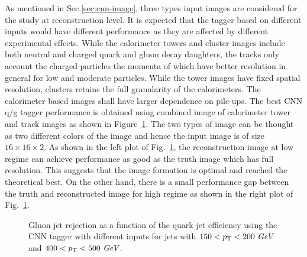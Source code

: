 As mentioned in Sec.\ref{sec:cnn-image}, three types input images are considered for the study at reconstruction level.
It is expected that the tagger based on different inputs would have different performance as they are affected
by different experimental effects. While the calorimeter towers and cluster images include both neutral and charged quark
and gluon decay daughters, the tracks only account the charged particles the momenta of which have better resolution
in general for low and moderate \pt particles. While the tower images have fixed spatial resolution,
clusters retains the full granularity of the calorimeters. The calorimeter based images shall have larger dependence on pile-ups.
The best CNN q/g tagger performance is obtained using combined image of calorimeter tower and track images as shown in
Figure~\ref{fig:cnn-input}.
The two types of image can be thought as two different colors of the image and hence the input image is of size $16\times 16\times 2$.
As shown in the left plot of Fig.~\ref{fig:cnn-input}, the reconstruction image at low \pt regime can achieve performance as good as
the truth image which has full resolution. This suggests that the image formation is optimal and reached the theoretical best. On the other hand,
there is a small performance gap between the truth and reconstructed image for high \pt regime as shown in the right plot of Fig.~\ref{fig:cnn-input}.

\begin{figure}[htpb]
\begin{center}
\caption{Gluon jet rejection as a function of the quark jet efficiency using the CNN tagger with different inputs
for jets with \protect{} $150<p_{{\rm T}}<200~\textit{GeV}$ and \protect{} $400<p_{{\rm T}}<500~\textit{GeV}$.}
\label{fig:cnn-input}
\end{center}
\end{figure}


